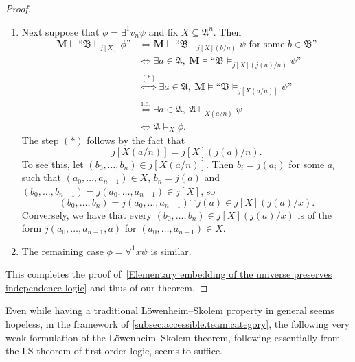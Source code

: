 \documentclass[a4paper]{amsart}
\theoremstyle{definition}
\theoremstyle{remark}
\newcommand{\A}{\mathcal{A}}
\newcommand{\B}{\mathcal{B}}
\newcommand{\existsone}{\exists^1}
\newcommand{\forallone}{\forall^1}
\theoremstyle{definition}
\renewcommand{\A}{\mathfrak{A}}
\renewcommand{\B}{\mathfrak{B}}
\newcommand{\bM}{\mathbf{M}}
\begin{document}
\begin{proof}
\begin{enumerate}
    \item Next suppose that $\phi = \existsone v_n\psi$ and fix $X\subseteq\A^n$. Then
    \begin{align*}
        \bM\models\text{``$\B\models_{j[X]}\phi$''} &\iff \bM\models\text{``$\B\models_{j[X](b/n)}\psi$ for some $b\in\B$''} \\
        &\iff \exists a\in\A,\ \bM\models\text{``$\B\models_{j[X](j(a)/n)}\psi$''} \\
        &\stackrel{(*)}\iff \exists a\in\A,\ \bM\models\text{``$\B\models_{j[X(a/n)]}\psi$''} \\
        &\stackrel{\text{i.h.}}\iff \exists a\in\A,\ \A\models_{X(a/n)}\psi \\
        &\iff \A\models_X\phi.
    \end{align*}
    The step $(*)$ follows by the fact that
    \begin{equation*}
        j[X(a/n)] = j[X](j(a)/n).
    \end{equation*}
    To see this, let $(b_0,\dots,b_n)\in j[X(a/n)]$. Then $b_i = j(a_i)$ for some $a_i$ such that $(a_0,\dots,a_{n-1})\in X$, $b_n = j(a)$ and $(b_0,\dots,b_{n-1}) = j(a_0,\dots,a_{n-1})\in j[X]$, so
    \[
        (b_0,\dots,b_n) = j(a_0,\dots,a_{n-1})^\frown j(a) \in j[X](j(a)/x).
    \]
    Conversely, we have that every $(b_0,\dots,b_n)\in j[X](j(a)/x)$ is of the form $j(a_0,\dots,a_{n-1},a)$ for $(a_0,\dots,a_{n-1})\in X$.
    
    \item The remaining case $\phi = \forallone x\psi$ is similar.
    \end{enumerate}
    \noindent This completes the proof of~\eqref{Elementary embedding of the universe preserves independence logic} and thus of our theorem.
\end{proof}

Even while having a traditional Löwenheim--Skolem property in general seems hopeless, in the framework of \cref{subsec:accessible.team.category}, the following very weak formulation of the Löwenheim--Skolem theorem, following essentially from the LS theorem of first-order logic, seems to suffice.
\end{document}
